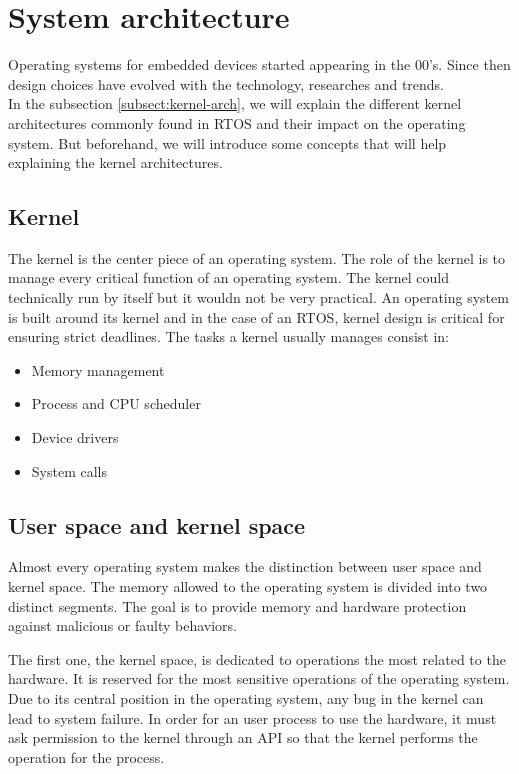 \section{System architecture}

Operating systems for embedded devices started appearing in the 00's.
Since then design choices have evolved with the technology, researches and trends.
\\
In the subsection \ref{subsect:kernel-arch}, we will explain the different kernel architectures commonly found in RTOS and their impact on the operating system.
But beforehand, we will introduce some concepts that will help explaining the kernel architectures.

\subsection{Kernel}
The kernel is the center piece of an operating system.
The role of the kernel is to manage every critical function of an operating system.
The kernel could technically run by itself but it wouldn not be very practical.
An operating system is built around its kernel and in the case of an RTOS, kernel design is critical for ensuring strict deadlines.
The tasks a kernel usually manages consist in:
\begin{itemize}
    \item Memory management
    \item Process and CPU scheduler
    \item Device drivers
    \item System calls
\end{itemize}

\subsection{User space and kernel space}
Almost every operating system makes the distinction between user space and kernel space.
The memory allowed to the operating system is divided into two distinct segments.
The goal is to provide memory and hardware protection against malicious or faulty behaviors.

The first one, the kernel space, is dedicated to operations the most related to the hardware.
It is reserved for the most sensitive operations of the operating system.
Due to its central position in the operating system, any bug in the kernel can lead to system failure.
In order for an user process to use the hardware, it must ask permission to the kernel through an API so that the kernel performs the operation for the process.


